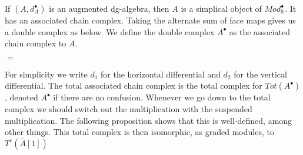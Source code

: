 \documentclass[../thesis.tex]{subfiles}
\begin{document}
            If $(A, d_A^\bullet)$ is an augmented dg-algebra, then $A$ is a simplical object of $Mod_\mathbb{K}^\bullet$. It has an associated chain complex. Taking the alternate sum of face maps gives us a double complex as below. We define the double complex $A^\bullet$ as the associated chain complex to $A$.
            \begin{center}
                $=$
            \end{center}
        
            For simplicity we write $d_1$ for the horizontal differential and $d_2$ for the vertical differential. The total associated chain complex is the total complex for $Tot(A^\bullet)$, denoted $A^\bullet$ if there are no confusion. Whenever we go down to the total complex we should switch out the multiplication with the suspended multiplication. The following proposition shows that this is well-defined, among other things. This total complex is then isomorphic, as graded modules, to $T^c(\bar{A}[1])$
\end{document}
